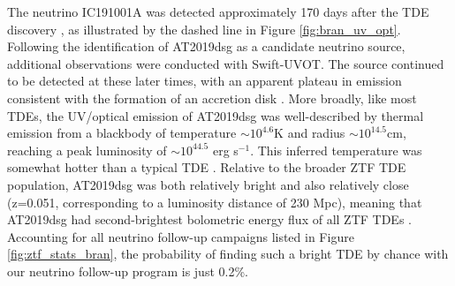 \documentclass[a4paper,11pt]{article}
\begin{document}
The neutrino IC191001A was detected approximately 170 days after the TDE discovery \cite{bran}, as illustrated by the dashed line in Figure \ref{fig:bran_uv_opt}. Following the identification of AT2019dsg as a candidate neutrino source, additional observations were conducted with Swift-UVOT. The source continued to be detected at these later times, with an apparent plateau in emission consistent with the formation of an accretion disk \cite{bran}. More broadly, like most TDEs, the UV/optical emission of AT2019dsg was well-described by thermal emission from a blackbody of temperature $\sim10^{4.6}$K and radius $\sim10^{14.5}$cm, reaching a peak luminosity of $\sim10^{44.5}$ erg s$^{-1}$. This inferred temperature was somewhat hotter than a typical TDE \cite{van_velzen_20}. Relative to the broader ZTF TDE population, AT2019dsg was both relatively bright and also relatively close (z=0.051, corresponding to a luminosity distance of 230 Mpc), meaning that AT2019dsg had second-brightest bolometric energy flux of all ZTF TDEs \cite{van_velzen_20}. Accounting for all neutrino follow-up campaigns listed in Figure \ref{fig:ztf_stats_bran}, the probability of finding such a bright TDE by chance with our neutrino follow-up program is just 0.2\%.
\end{document}
